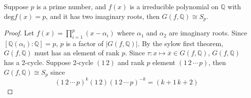 \begin{proposition}
    Suppose $p$ is a prime number, and $f(x)$ is a irreducible polynomial on $\mathbb{Q}$ with $\mathrm{deg}f(x)=p$, and it has two imaginary roots, then $G(f,\mathbb{Q})\cong S_p$.
    \begin{proof}
        Let $f(x)=\prod^p_{i=1}(x-\alpha_i)$ where $\alpha_1$ and $\alpha_2$ are imaginary roots. Since $[\mathbb{Q}(\alpha_i):\mathbb{Q}]=p$, $p$ is a factor of $|G(f,\mathbb{Q})|$. By the sylow first theorem, $G(f,\mathbb{Q})$ must has an element of rank $p$. Since $\tau:x\mapsto\overline{x}\in G(f,\mathbb{Q})$, $G(f,\mathbb{Q})$ has a 2-cycle. Suppose 2-cycle $(1\, 2)$ and rank $p$ element $(1\, 2\,\cdots\,p)$, then $G(f,\mathbb{Q})\cong S_p$ since
        $$
        (1\, 2\,\cdots\,p)^k(1\,2)(1\, 2\,\cdots\,p)^{-k}=(k+1\,k+2)
        $$
    \end{proof}
\end{proposition}